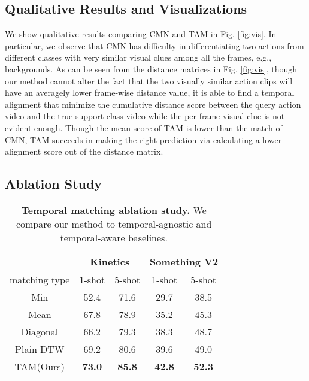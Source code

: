 \documentclass[10pt,twocolumn,letterpaper]{article}
\begin{document}
\subsection{Qualitative Results and Visualizations}

We show qualitative results comparing CMN and TAM in Fig. \ref{fig:vis}. In particular, we observe that CMN has difficulty in differentiating two actions from different classes with very similar visual clues among all the frames, e.g., backgrounds. As can be seen from the distance matrices in Fig. \ref{fig:vis}, though our method cannot alter the fact that the two visually similar action clips will have an averagely lower frame-wise distance value, it is able to find a temporal alignment that minimize the cumulative distance score between the query action video and the true support class video while the per-frame visual clue is not evident enough. Though the mean score of TAM is lower than the match of CMN, TAM succeeds in making the right prediction via calculating a lower alignment score out of the distance matrix.

\subsection{Ablation Study}

\begin{table}[bt]
\small
\caption{\textbf{Temporal matching ablation study.} We compare our method to temporal-agnostic and temporal-aware baselines.}
\vspace{-10pt}
\begin{center}
\begin{tabular}{c|cc|cc}
\hline
       & \multicolumn{2}{c|}{Kinetics}        & \multicolumn{2}{c}{Something V2}     \\ \hline
matching type & \multicolumn{1}{c|}{1-shot} & 5-shot & \multicolumn{1}{c|}{1-shot} & 5-shot \\ \hline
Min & 52.4 & 71.6 & 29.7 & 38.5 \\
Mean & 67.8 & 78.9 & 35.2 & 45.3 \\
Diagonal & 66.2 & 79.3 & 38.3 & 48.7  \\
Plain DTW & 69.2 & 80.6 & 39.6 & 49.0 \\
TAM(Ours) & \textbf{73.0} & \textbf{85.8} & \textbf{42.8} & \textbf{52.3}  \\
\hline
\end{tabular}
\end{center}
\vspace{-0.5cm}
\label{temporal}
\end{table}
\end{document}
